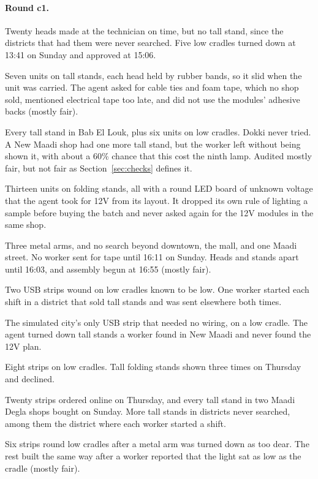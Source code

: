 \documentclass[10pt]{article}
\begin{document}
\paragraph{Round c1.}
\begin{description}[style=unboxed, leftmargin=0pt, font=\normalfont\bfseries]
  \item[Seed 10 hinted (0 lamps).] Twenty heads made at the technician on time, but no tall stand, since the districts that had
  them were never searched. Five low cradles turned down at 13:41 on Sunday and approved at 15:06.
  \item[Seed 11 hinted (0).] Seven units on tall stands, each head held by rubber bands, so it slid when the unit was carried.
  The agent asked for cable ties and foam tape, which no shop sold, mentioned electrical tape too late, and did not use the
  modules' adhesive backs (mostly fair).
  \item[Seed 12 hinted (8).] Every tall stand in Bab El Louk, plus six units on low cradles. Dokki never tried. A New Maadi shop
  had one more tall stand, but the worker left without being shown it, with about a 60\% chance that this cost the ninth lamp.
  Audited mostly fair, but not fair as Section~\ref{sec:checks} defines it.
  \item[Seed 13 hinted (0).] Thirteen units on folding stands, all with a round LED board of unknown voltage that the agent took
  for 12V from its layout. It dropped its own rule of lighting a sample before buying the batch and never asked again for the 12V
  modules in the same shop.
  \item[Seed 14 hinted (0).] Three metal arms, and no search beyond downtown, the mall, and one Maadi street. No worker sent for
  tape until 16:11 on Sunday. Heads and stands apart until 16:03, and assembly begun at 16:55 (mostly fair).
  \item[Seed 10 unhinted (0).] Two USB strips wound on low cradles known to be low. One worker started each shift in a district
  that sold tall stands and was sent elsewhere both times.
  \item[Seed 11 unhinted (0).] The simulated city's only USB strip that needed no wiring, on a low cradle. The agent turned down
  tall stands a worker found in New Maadi and never found the 12V plan.
  \item[Seed 12 unhinted (0).] Eight strips on low cradles. Tall folding stands shown three times on Thursday and declined.
  \item[Seed 13 unhinted (8).] Twenty strips ordered online on Thursday, and every tall stand in two Maadi Degla shops bought on
  Sunday. More tall stands in districts never searched, among them the district where each worker started a shift.
  \item[Seed 14 unhinted (0).] Six strips round low cradles after a metal arm was turned down as too dear. The rest built the
  same way after a worker reported that the light sat as low as the cradle (mostly fair).
\end{description}
\end{document}

